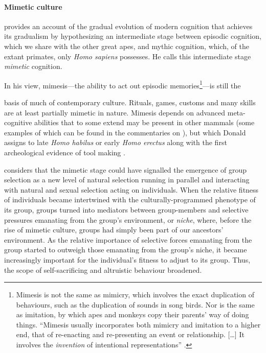 \documentclass{article}
\begin{document}
\paragraph{Mimetic culture}

\citet{donald1991} provides an account of the gradual evolution of modern
cognition that achieves its gradualism by hypothesizing an intermediate stage
between episodic cognition, which we share with the other great apes, and
mythic cognition, which, of the extant primates, only \textit{Homo sapiens}
possesses. He calls this intermediate stage \textit{mimetic} cognition.

In his view, mimesis---the ability to act out episodic
memories\footnote{Mimesis is not the same as mimicry, which involves the exact
  duplication of behaviours, such as the duplication of sounds in song birds.
  Nor is the same as imitation, by which apes and monkeys copy their parents'
  way of doing things.  “Mimesis usually incorporates both mimicry and
    imitation to a higher end, that of re-enacting and re-presenting an event
    or relationship. [\ldots] It involves the \textit{invention} of intentional
    representations” \citep{donald1991}.}---is still the

basis of much of contemporary culture. Rituals, games, customs and many skills
are at least partially mimetic in nature. Mimesis depends on advanced
meta-cognitive abilities that to some extend may be present in other mammals
(some examples of which can be found in the commentaries on
\citealp[pp.~755--756, 768, 771-772]{donald1993}), but which Donald assigns to
late \textit{Homo habilus} or early \textit{Homo erectus} along with the first
archeological evidence of tool making \citep{donald1991,donald1993}.

\citet[pp.~254, 338]{donald2001} considers that the mimetic stage could have
signalled the emergence of group selection as a new level of natural selection
running in parallel and interacting with natural and sexual selection acting
on individuals. When the relative fitness of individuals became intertwined
with the culturally-programmed phenotype of its group, groups turned into
mediators between group-members and selective pressures emanating from the
group's environment, or \emph{niche}, where, before the rise of mimetic culture,
groups had simply been part of our ancestors' environment. As the relative
importance of selective forces emanating from the group started to outweigh
those emanating from the group's niche, it became increasingly important for
the individual's fitness to adjust to its group. Thus, the scope of
self-sacrificing and altruistic behaviour broadened.
\end{document}
